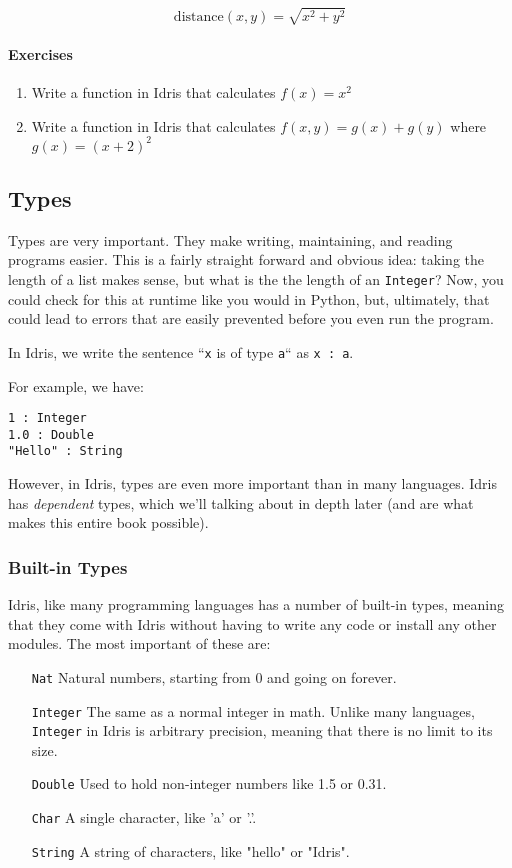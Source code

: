 \documentclass{article}
\newcommand{\inline}[1]{\texttt{#1}}
\begin{document}
\[
    \mathrm{distance}(x, y) = \sqrt{x^2 + y^2}
\]

\paragraph{Exercises}

\begin{enumerate}
    \item Write a function in Idris that calculates $f(x) = x^2$
    \item Write a function in Idris that calculates $f(x,y) = g(x) + g(y)$ where $g(x) = (x + 2)^2$
\end{enumerate}

\subsection{Types}
Types are very important.
They make writing, maintaining, and reading programs easier.
This is a fairly straight forward and obvious idea: taking the length of a list makes sense, but what is the the length of an \inline{Integer}?
Now, you could check for this at runtime like you would in Python, but, ultimately, that could lead to errors that are easily prevented before you even run the program.

In Idris, we write the sentence ``\inline{x} is of type \inline{a}`` as \inline{x : a}.

For example, we have:

\begin{verbatim}
1 : Integer
1.0 : Double
"Hello" : String
\end{verbatim}

However, in Idris, types are even more important than in many languages.
Idris has \textit{dependent} types, which we'll talking about in depth later (and are what makes this entire book possible).

\subsubsection{Built-in Types}
Idris, like many programming languages has a number of built-in types, meaning that they come with Idris without having to write any code or install any other modules.
The most important of these are:

\begin{itemize}
    \item[\inline{Nat}] Natural numbers, starting from 0 and going on forever.
    \item[\inline{Integer}] The same as a normal integer in math.
        Unlike many languages, \inline{Integer} in Idris is arbitrary precision, meaning that there is no limit to its size.
    \item[\inline{Double}] Used to hold non-integer numbers like 1.5 or 0.31.
    \item[\inline{Char}] A single character, like 'a' or '.'.
    \item[\inline{String}] A string of characters, like "hello" or "Idris".
\end{itemize}
\end{document}
